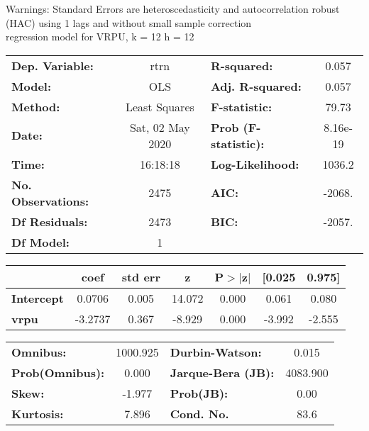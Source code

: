 Warnings: \newline
 [1] Standard Errors are heteroscedasticity and autocorrelation robust (HAC) using 1 lags and without small sample correction\\ 

regression model for VRPU, k = 12 h = 12\begin{center}
\begin{tabular}{lclc}
\toprule
\textbf{Dep. Variable:}    &       rtrn       & \textbf{  R-squared:         } &     0.057   \\
\textbf{Model:}            &       OLS        & \textbf{  Adj. R-squared:    } &     0.057   \\
\textbf{Method:}           &  Least Squares   & \textbf{  F-statistic:       } &     79.73   \\
\textbf{Date:}             & Sat, 02 May 2020 & \textbf{  Prob (F-statistic):} &  8.16e-19   \\
\textbf{Time:}             &     16:18:18     & \textbf{  Log-Likelihood:    } &    1036.2   \\
\textbf{No. Observations:} &        2475      & \textbf{  AIC:               } &    -2068.   \\
\textbf{Df Residuals:}     &        2473      & \textbf{  BIC:               } &    -2057.   \\
\textbf{Df Model:}         &           1      & \textbf{                     } &             \\
\bottomrule
\end{tabular}
\begin{tabular}{lcccccc}
                   & \textbf{coef} & \textbf{std err} & \textbf{z} & \textbf{P$> |$z$|$} & \textbf{[0.025} & \textbf{0.975]}  \\
\midrule
\textbf{Intercept} &       0.0706  &        0.005     &    14.072  &         0.000        &        0.061    &        0.080     \\
\textbf{vrpu}      &      -3.2737  &        0.367     &    -8.929  &         0.000        &       -3.992    &       -2.555     \\
\bottomrule
\end{tabular}
\begin{tabular}{lclc}
\textbf{Omnibus:}       & 1000.925 & \textbf{  Durbin-Watson:     } &    0.015  \\
\textbf{Prob(Omnibus):} &   0.000  & \textbf{  Jarque-Bera (JB):  } & 4083.900  \\
\textbf{Skew:}          &  -1.977  & \textbf{  Prob(JB):          } &     0.00  \\
\textbf{Kurtosis:}      &   7.896  & \textbf{  Cond. No.          } &     83.6  \\
\bottomrule
\end{tabular}
\end{center}

